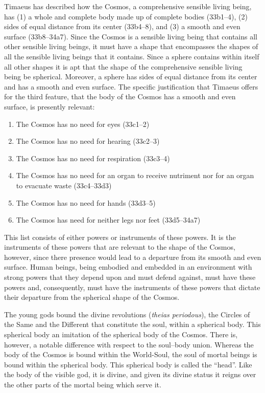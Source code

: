 Timaeus has described how the Cosmos, a comprehensive sensible living being, has (1) a whole and complete body made up of complete bodies (33b1–4), (2) sides of equal distance from its center (33b4–8), and (3) a smooth and even surface (33b8–34a7). Since the Cosmos is a sensible living being that contains all other sensible living beings, it must have a shape that encompasses the shapes of all the sensible living beings that it contains. Since a sphere contains within itself all other shapes it is apt that the shape of the comprehensive sensible living being be spherical. Moreover, a sphere has sides of equal distance from its center and has a smooth and even surface. The specific justification that Timaeus offers for the third feature, that the body of the Cosmos has a smooth and even surface, is presently relevant:
\begin{enumerate}
	\item The Cosmos has no need for eyes (33c1–2)
	\item The Cosmos has no need for hearing (33c2–3)
	\item The Cosmos has no need for respiration (33c3–4)
	\item The Cosmos has no need for an organ to receive nutriment nor for an organ to evacuate waste (33c4–33d3)
	\item The Cosmos has no need for hands (33d3–5)
	\item The Cosmos has need for neither legs nor feet (33d5–34a7)
\end{enumerate}
This list consists of either powers or instruments of these powers. It is the instruments of these powers that are relevant to the shape of the Cosmos, however, since there presence would lead to a departure from its smooth and even surface. Human beings, being embodied and embedded in an environment with strong powers that they depend upon and must defend against, must have these powers and, consequently, must have the instruments of these powers that dictate their departure from the spherical shape of the Cosmos.

The young gods bound the divine revolutions (\emph{theias periodous}), the Circles of the Same and the Different that constitute the soul, within a spherical body. This spherical body an imitation of the spherical body of the Cosmos. There is, however, a notable difference with respect to the soul--body union. Whereas the body of the Cosmos is bound within the World-Soul, the soul of mortal beings is bound within the spherical body. This spherical body is called the ``head''. Like the body of the visible god, it is divine, and given its divine status it reigns over the other parts of the mortal being which serve it. 

